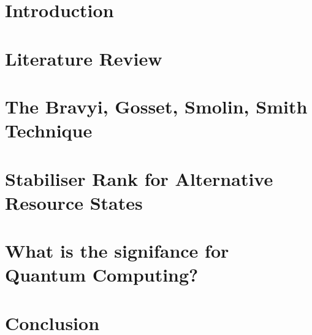 \documentclass[11pt,a4paper,twoside]{report}
\theoremstyle{plain}%
\theoremstyle{definition}
\theoremstyle{remark}
\begin{document}

\restoregeometry 
\begin{abstract}
   
\end{abstract}
\tableofcontents
\pagebreak
\chapter{Introduction}\label{chap:intro}

\chapter{Literature Review}\label{chap:litreview}

\chapter{The Bravyi, Gosset, Smolin, Smith Technique}\label{chap:bssg}

\chapter{Stabiliser Rank for Alternative Resource States}
\chapter{What is the signifance for Quantum Computing?}
\chapter{Conclusion}


\end{document}
